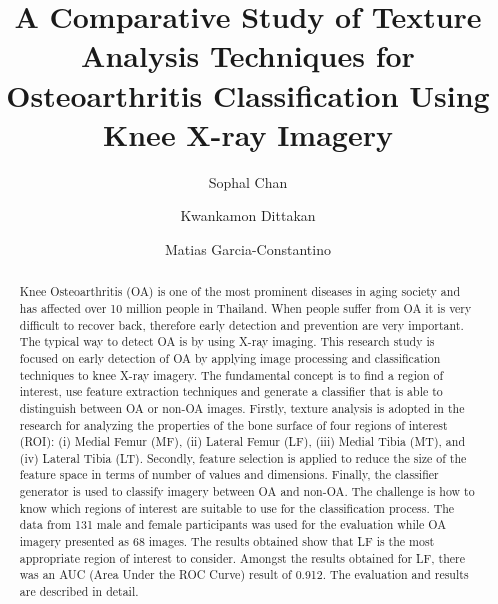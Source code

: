 \documentclass[review]{elsarticle}
\begin{document}
\begin{frontmatter}

\title{A Comparative Study of Texture Analysis Techniques for Osteoarthritis Classification Using Knee X-ray Imagery}


\author[mymainaddress]{Sophal Chan}
\author[mymainaddress]{Kwankamon Dittakan}
\author[mysecondaryaddress]{Matias Garcia-Constantino}



\address[mymainaddress]{College of Computing, Prince of Songkla University, 80, Moo 1, Vichitsongkram Rd, Kathu, Kathu, Phuket, Thailand 83120}
\address[mysecondaryaddress]{School of Computing, Ulster University, Shore Road, Newtownabbey, County Antrim, BT37 0QB, United Kingdom}

\begin{abstract}
Knee Osteoarthritis (OA) is one of the most prominent diseases in aging society and has affected over 10 million people in Thailand. When people suffer from OA it is very difficult to recover back, therefore early detection and prevention are very important. The typical way to detect OA is by using X-ray imaging. This research study is focused on early detection of OA by applying image processing and classification techniques to knee X-ray imagery. The fundamental concept is to find a region of interest, use feature extraction techniques and generate a classiﬁer that is able to distinguish between OA or non-OA images. Firstly, texture analysis is adopted in the research for analyzing the properties of the bone surface of four regions of interest (ROI): (i) Medial Femur (MF), (ii) Lateral Femur (LF), (iii) Medial Tibia (MT), and (iv) Lateral Tibia (LT). Secondly, feature selection is applied to reduce the size of the feature space in terms of number of values and dimensions. Finally, the classifier generator is used to classify imagery between OA and non-OA. The challenge is how to know which regions of interest are suitable to use for the classification process. The data from 131 male and female participants was used for the evaluation while OA imagery presented as 68 images. The results obtained show that LF is the most appropriate region of interest to consider. Amongst the results obtained for LF, there was an AUC (Area Under the ROC Curve) result of 0.912. The evaluation and results are described in detail.
\end{abstract}


\end{frontmatter}
\end{document}
